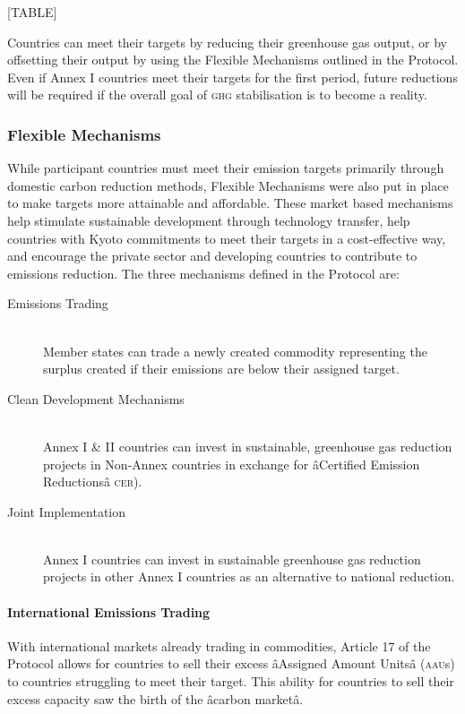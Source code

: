 [TABLE]

Countries can meet their targets by reducing their greenhouse gas output, or by offsetting their output by using the Flexible Mechanisms outlined in the Protocol. Even if Annex I countries meet their targets for the first period, future reductions will be required if the overall goal of \textsc{ghg} stabilisation is to become a reality.

\subsubsection{Flexible Mechanisms}

While participant countries must meet their emission targets primarily through domestic carbon reduction methods, Flexible Mechanisms were also put in place to make targets more attainable and affordable. These market based mechanisms help stimulate sustainable development through technology transfer, help countries with Kyoto commitments to meet their targets in a cost-effective way, and encourage the private sector and developing countries to contribute to emissions reduction. The three mechanisms defined in the Protocol are:

\begin{description}
	\item[Emissions Trading] \hfill \\
	Member states can trade a newly created commodity representing the surplus created if their emissions are below their assigned target.
	
	\item[Clean Development Mechanisms] \hfill \\
	Annex I \& II countries can invest in sustainable, greenhouse gas reduction projects in Non-Annex countries in exchange for âCertified Emission Reductionsâ \textsc{cer}).~\cite{UNFCCC-05}

	\item[Joint Implementation] \hfill \\
	Annex I countries can invest in sustainable greenhouse gas reduction projects in other Annex I countries as an alternative to national reduction.
\end{description}

\paragraph{International Emissions Trading}

With international markets already trading in commodities, Article 17 of the Protocol allows for countries to sell their excess âAssigned Amount Unitsâ (\textsc{aau}s) to countries struggling to meet their target. This ability for countries to sell their excess capacity saw the birth of the âcarbon marketâ.


